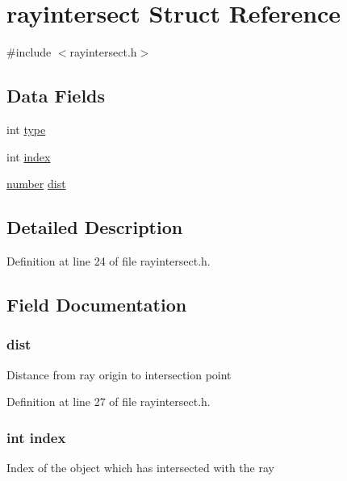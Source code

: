 \hypertarget{structrayintersect}{}\section{rayintersect Struct Reference}
\label{structrayintersect}


{\ttfamily \#include $<$rayintersect.\+h$>$}

\subsection*{Data Fields}
\begin{DoxyCompactItemize}
\item 
int \hyperlink{structrayintersect_ac765329451135abec74c45e1897abf26}{type}
\item 
int \hyperlink{structrayintersect_a750b5d744c39a06bfb13e6eb010e35d0}{index}
\item 
\hyperlink{raymath_8h_aa97c1f529dc5a11a78758184c84a39c9}{number} \hyperlink{structrayintersect_a07e9dd77b166f64838cd72a6213894ef}{dist}
\end{DoxyCompactItemize}


\subsection{Detailed Description}


Definition at line 24 of file rayintersect.\+h.



\subsection{Field Documentation}
\subsubsection[{\texorpdfstring{dist}{dist}}]{ dist}\hypertarget{structrayintersect_a07e9dd77b166f64838cd72a6213894ef}{}\label{structrayintersect_a07e9dd77b166f64838cd72a6213894ef}
Distance from ray origin to intersection point 

Definition at line 27 of file rayintersect.\+h.

\subsubsection[{\texorpdfstring{index}{index}}]{\setlength{\rightskip}{0pt plus 5cm}int index}\hypertarget{structrayintersect_a750b5d744c39a06bfb13e6eb010e35d0}{}\label{structrayintersect_a750b5d744c39a06bfb13e6eb010e35d0}
Index of the object which has intersected with the ray 

